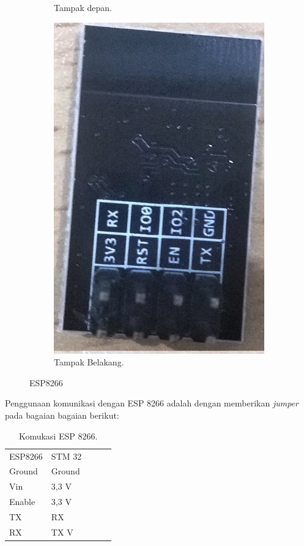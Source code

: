 \documentclass[11pt]{article}
\numberwithin{equation}{subsection}
\begin{document}
\begin{figure}[h!]
\begin{subfigure}[b]{0.39\linewidth}
		\caption{Tampak depan.}
	\end{subfigure}
	\begin{subfigure}[b]{0.4\linewidth}
		\includegraphics[width=\linewidth]{dokumentasi/ESP8266/wifi1.jpg}
		\caption{Tampak Belakang.}
	\end{subfigure}
	\caption{ESP8266}
	\label{fig:ESP8266}
\end{figure}
Penggunaan komunikasi dengan ESP 8266 adalah dengan memberikan \textit{jumper} pada bagaian bagaian berikut: 
\begin{table}[h!]
	 \caption{Komukasi ESP 8266.}
	\label{tab:Komukasi ESP 8266}
	\begin{tabular}{|l|l|lll}
		\cline{1-2}
		ESP8266 & STM 32 &  &  &  \\ \cline{1-2}
		Ground  & Ground &  &  &  \\ \cline{1-2}
		Vin     & 3,3 V  &  &  &  \\ \cline{1-2}
		Enable  & 3,3 V  &  &  &  \\ \cline{1-2}
		TX  	& RX  	&  &  &  \\ \cline{1-2}
		RX  	& TX V  &  &  &  \\ \cline{1-2}
	\end{tabular}
\end{table}
\end{document}
